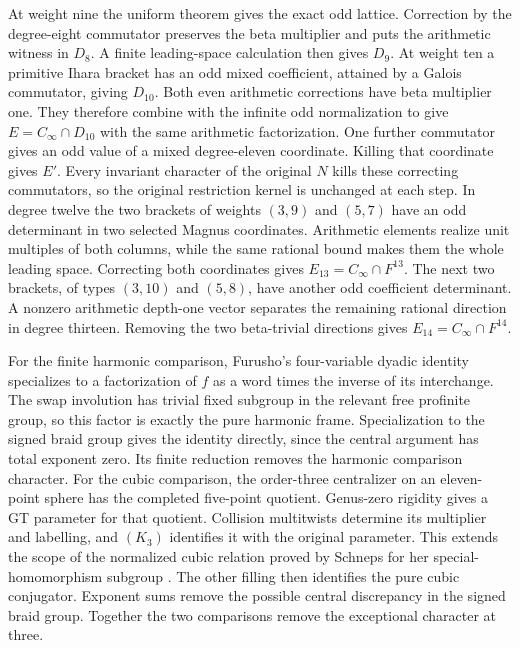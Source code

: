 \documentclass[11pt,a4paper]{article}
\theoremstyle{definition}
\theoremstyle{remark}
\begin{document}
At weight nine the uniform theorem gives the exact odd lattice.
Correction by the degree-eight commutator preserves the beta multiplier
and puts the arithmetic witness in $D_8$. A finite leading-space
calculation then gives $D_9$. At weight ten a primitive Ihara bracket
has an odd mixed coefficient, attained by a Galois commutator, giving
$D_{10}$. Both even arithmetic corrections have beta multiplier one.
They therefore combine with the infinite odd normalization to give
$E=C_\infty\cap D_{10}$ with the same arithmetic factorization.
One further commutator gives an odd value of a mixed degree-eleven
coordinate. Killing that coordinate gives $E'$. Every invariant
character of the original $N$ kills these correcting commutators,
so the original restriction kernel is unchanged at each step.
In degree twelve the two brackets of weights $(3,9)$ and $(5,7)$
have an odd determinant in two selected Magnus coordinates.
Arithmetic elements realize unit multiples of both columns, while
the same rational bound makes them the whole leading space.
Correcting both coordinates gives $E_{13}=C_\infty\cap F^{13}$.
The next two brackets, of types $(3,10)$ and $(5,8)$, have another
odd coefficient determinant. A nonzero arithmetic depth-one vector
separates the remaining rational direction in degree thirteen.
Removing the two beta-trivial directions gives
$E_{14}=C_\infty\cap F^{14}$.

For the finite harmonic comparison, Furusho's four-variable
dyadic identity specializes to a factorization of $f$ as a word
times the inverse of its interchange. The swap involution has
trivial fixed subgroup in the relevant free profinite group, so
this factor is exactly the pure harmonic frame. Specialization
to the signed braid group gives the identity directly, since the
central argument has total exponent zero. Its finite reduction removes the harmonic comparison
character. For the cubic comparison, the order-three centralizer
on an eleven-point sphere has the completed five-point quotient.
Genus-zero rigidity gives a GT parameter for that quotient.
Collision multitwists determine its multiplier and labelling, and
$(K_3)$ identifies it with the original parameter.
This extends the scope of the normalized cubic relation proved by
Schneps for her special-homomorphism subgroup
\cite[Theorem~3.4 and equation~(3.10), p.~667]{Schneps2006Special}. The other
filling then identifies the pure cubic conjugator. Exponent sums
remove the possible central discrepancy in the signed braid group.
Together the two comparisons remove the exceptional character at three.
\end{document}
